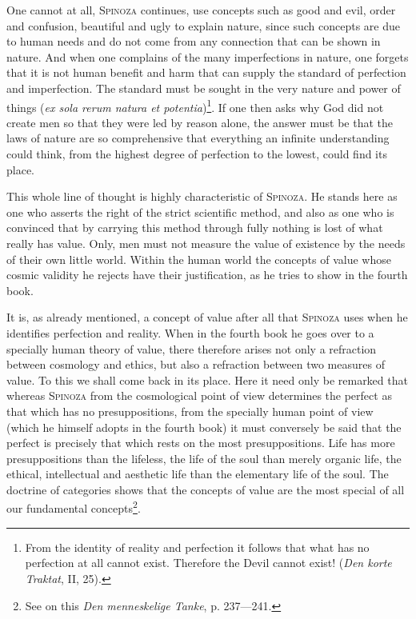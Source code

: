 \documentclass[12pt]{article}
\newcommand{\opage}[1]{\marginnote{\footnotesize\textit{[#1]}}}
\begin{document}
One cannot at all, \textsc{Spinoza} continues, use concepts such as good and evil, order
and confusion, beautiful and ugly to explain nature, since such concepts are due to human
needs and do not come from any connection that can be shown in nature. And when one
complains of the many imperfections in nature, one forgets that it is not human benefit
and harm that can supply the standard \opage{33}of perfection and imperfection. The
standard must be sought in the very nature and power of things (\textit{ex sola rerum
natura et potentia})\footnote{From the identity of reality and perfection it follows that
what has no perfection at all cannot exist. Therefore the Devil cannot exist! (\textit{Den
korte Traktat}, II, 25).}. If one then asks why God did not create men so that they were
led by reason alone, the answer must be that the laws of nature are so comprehensive that
everything an infinite understanding could think, from the highest degree of perfection to
the lowest, could find its place.

This whole line of thought is highly characteristic of \textsc{Spinoza}. He stands here as
one who asserts the right of the strict scientific method, and also as one who is convinced
that by carrying this method through fully nothing is lost of what really has value. Only,
men must not measure the value of existence by the needs of their own little world. Within
the human world the concepts of value whose cosmic validity he rejects have their
justification, as he tries to show in the fourth book.

It is, as already mentioned, a concept of value after all that \textsc{Spinoza} uses when
he identifies perfection and reality. When in the fourth book he goes over to a specially
human theory of value, there therefore arises not only a refraction between cosmology and
ethics, but also a refraction between two measures of value. To this we shall come back in
its place. Here it need only be remarked that whereas \textsc{Spinoza} from the
cosmological point of view determines the perfect as that which has no presuppositions,
from the specially human point of view (which he himself adopts in the fourth book) it
must conversely be said that the perfect is precisely that which rests on the most
presuppositions. Life has more presuppositions than the lifeless, the life of the soul than
merely organic life, the ethical, intellectual and aesthetic life than the elementary life
of the soul. The doctrine of categories shows that the concepts of value are the most
special of all our fundamental concepts\footnote{See on this \textit{Den menneskelige
Tanke}, p. 237---241.}.
\end{document}
